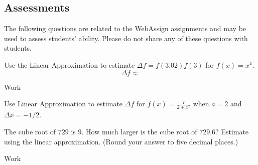\documentclass[12pt,addpoints, answers, fleqn]{exam}
\begin{document}
	
\begin{teacher}
\subsection{Assessments}
The following questions are related to the WebAssign assignments and may be used to assess students' ability. Please do not share any of these questions with students.
\begin{questions}	
\question 	%

Use the Linear Approximation to estimate $\Delta f = f\left(3.02\right)  f\left(3\right)$ for $f\left(x\right) = x^4$.
\[
\Delta f \approx
\]
\begin{solution}
Work
\end{solution}


\question 	%

Use Linear Approximation to estimate $\Delta f$ for $f\left(x\right) = \displaystyle \frac{7}{2+x^2}$ when $a = 2$ and $\Delta x = -1/2$.






\question 	%

The cube root of $729$ is $9$. How much larger is the cube root of $729.6$? Estimate using the linear approximation. (Round your answer to five decimal places.)
\begin{solution}
Work
\end{solution}


\end{questions}
\end{teacher}
\end{document}
